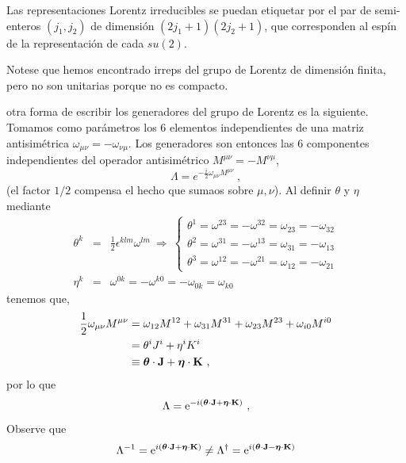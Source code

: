 \begin{cabox}
    Las representaciones Lorentz irreducibles se puedan etiquetar por el par de semi-enteros $(j_{1},j_{2})$ de dimensión $(2j_{1}+1)(2j_{2}+1)$, que corresponden al espín de la representación de cada $su(2)$.
\end{cabox}

Notese que hemos encontrado irreps del grupo de Lorentz de dimensión finita, pero no son unitarias porque no es compacto.

otra forma de escribir los generadores del grupo de Lorentz es la siguiente. Tomamos como parámetros los $6$ elementos independientes de una matriz antisimétrica $\omega_{\mu \nu}=-\omega_{\nu \mu}$. Los generadores son entonces las $6$ componentes independientes del operador antisimétrico $M^{\mu \nu}=-M^{\nu \mu}$,
\begin{equation}
    \Lambda = e^{-\frac{i}{2}\omega_{\mu\nu}M^{\mu \nu}}~,
    \label{eqA1_2.19}
\end{equation}
(el factor $1/2$ compensa el hecho que sumaos sobre $\mu,\nu$). Al definir $\theta$ y $\eta$ mediante
\begin{eqnarray}
\theta ^{k} &=&\frac{1}{2}\epsilon ^{klm}\omega ^{lm}~\Rightarrow ~\left\{ 
\begin{array}{c}
\theta ^{1}=\omega ^{23}=-\omega ^{32}=\omega _{23}=-\omega _{32} \\ 
\theta ^{2}=\omega ^{31}=-\omega ^{13}=\omega _{31}=-\omega _{13} \\ 
\theta ^{3}=\omega ^{12}=-\omega ^{21}=\omega _{12}=-\omega _{21}
\end{array}
\right.  \\
\eta ^{k} &=&\omega ^{0k}=-\omega ^{k0}=-\omega _{0k}=\omega _{k0}
\end{eqnarray}
tenemos que,
\begin{equation}
\begin{split}
    \frac{1}{2}\omega_{\mu \nu}M^{\mu \nu} &=  \omega_{12}M^{12}+\omega_{31}M^{31}+\omega_{23}M^{23}+\omega_{i0}M^{i0} \\
    & = \theta^{i}J^{i} + \eta^{i}K^{i}  \\
    & \equiv \vb*{\theta} \cdot \vb{J} + \vb*{\eta} \cdot \vb{K}~,  
\end{split}
\end{equation}
por lo que
\begin{equation}
    \Lambda=\mathrm{e}^{-i\qty(\vb*{\theta} \cdot \vb{J} + \vb*{\eta} \cdot \vb{K}) }~,
    \label{eqA_71}
\end{equation}
Observe que 
\begin{equation}
    \Lambda^{-1}=\mathrm{e}^{i\qty(\vb*{\theta} \cdot \vb{J} + \vb*{\eta} \cdot \vb{K}) } \neq \Lambda^{\dagger}=\mathrm{e}^{i\qty(\vb*{\theta} \cdot \vb{J} - \vb*{\eta} \cdot \vb{K}) }
\end{equation}


